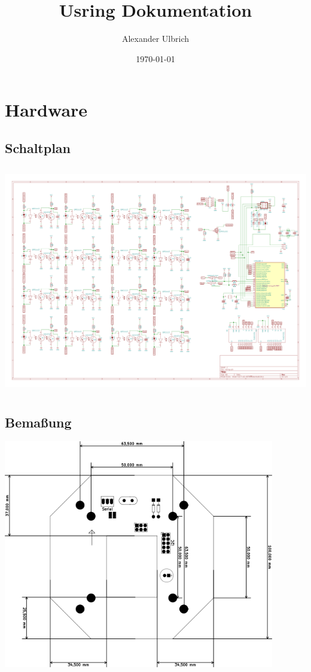 \documentclass{article}
\begin{document}
	
\begin{titlepage}
\title{Usring Dokumentation}
\date{\today}
\author{Alexander Ulbrich}
\maketitle	
\end{titlepage}

\tableofcontents 
\newpage
	
\section{Hardware}

\subsection{Schaltplan}

\includegraphics[height=10cm]{image/usring.jpg}
\subsection{Bemaßung}

\includegraphics[height=10cm]{image/usring-dimensions.png}
\end{document}

